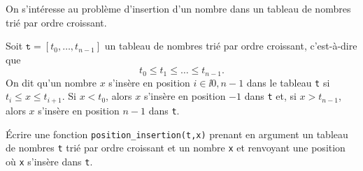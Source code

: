 On s'intéresse au problème d'insertion d'un nombre dans un tableau de nombres trié par ordre croissant. 

Soit $\texttt{t} = [t_0,\dots,t_{n-1}]$ un tableau de nombres trié par ordre croissant, c'est-à-dire que 
\begin{equation*}
  t_0  \leq t_1 \leq \dots \leq t_{n-1}.
\end{equation*}
On dit qu'un nombre $x$ s'insère en position $i \in \ii{0,n-1}$ dans le tableau \texttt{t} si $t_i \leq x \leq t_{i+1}$. 
Si $x < t_0$, alors $x$ s'insère en position $-1$ dans \texttt{t} et, si $x>t_{n-1}$, alors $x$ s'insère en position $n-1$ dans \texttt{t}.

\bigskip{}

\question{} Écrire une fonction \texttt{position\_insertion(t,x)} prenant en argument un tableau de nombres \texttt{t} trié par ordre croissant et un nombre \texttt{x} et renvoyant une position où \texttt{x} s'insère dans \texttt{t}. 
